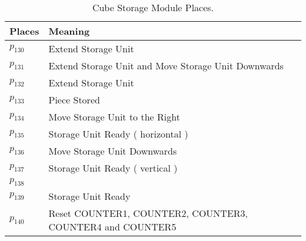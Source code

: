 \begin{table}[H]
\caption{Cube Storage Module Places.}
\centering
\begin{tabular}{M{5cm}M{10cm}}
Places & Meaning\\
\hline
\hyperlink{partialNet:p130}{\hypertarget{partialTable:p130}{$p_{130}$}} & Extend Storage Unit\\
\hyperlink{partialNet:p131}{\hypertarget{partialTable:p131}{$p_{131}$}} & Extend Storage Unit and Move Storage Unit Downwards\\
\hyperlink{partialNet:p132}{\hypertarget{partialTable:p132}{$p_{132}$}} & Extend Storage Unit\\
\hyperlink{partialNet:p133}{\hypertarget{partialTable:p133}{$p_{133}$}} & Piece Stored\\
\hyperlink{partialNet:p134}{\hypertarget{partialTable:p134}{$p_{134}$}} & Move Storage Unit to the Right\\
\hyperlink{partialNet:p135}{\hypertarget{partialTable:p135}{$p_{135}$}} & Storage Unit Ready ( horizontal )\\
\hyperlink{partialNet:p136}{\hypertarget{partialTable:p136}{$p_{136}$}} & Move Storage Unit Downwards\\
\hyperlink{partialNet:p137}{\hypertarget{partialTable:p137}{$p_{137}$}} & Storage Unit Ready ( vertical )\\
\hyperlink{partialNet:p138}{\hypertarget{partialTable:p138}{$p_{138}$}} & \\
\hyperlink{partialNet:p139}{\hypertarget{partialTable:p139}{$p_{139}$}} & Storage Unit Ready\\
\hyperlink{partialNet:p140}{\hypertarget{partialTable:p140}{$p_{140}$}} & Reset COUNTER1, COUNTER2, COUNTER3, COUNTER4 and COUNTER5\\
\end{tabular}
\end{table}

